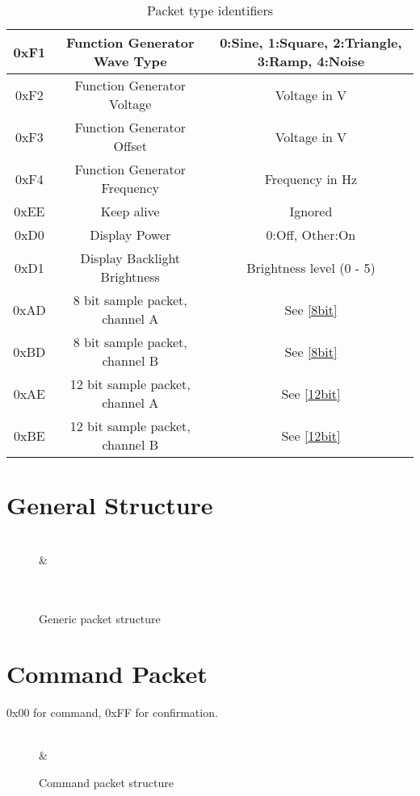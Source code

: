 \documentclass[]{article}
\begin{document}
\begin{table}[H]
\begin{tabular}{|c|c|c|}
		0xF1 & Function Generator Wave Type & 0:Sine, 1:Square, 2:Triangle, 3:Ramp, 4:Noise \\ \hline
		0xF2 & Function Generator Voltage & Voltage in \textmu V \\ \hline
		0xF3 & Function Generator Offset & Voltage in \textmu V \\ \hline
		0xF4 & Function Generator Frequency & Frequency in Hz \\ \hline
		0xEE & Keep alive & Ignored \\ \hline
		0xD0 & Display Power & 0:Off, Other:On \\ \hline
		0xD1 & Display Backlight Brightness & Brightness level (0 - 5) \\ \hline
		0xAD & 8 bit sample packet, channel A & See \autoref{8bit} \\ \hline
		0xBD & 8 bit sample packet, channel B & See \autoref{8bit} \\ \hline
		0xAE & 12 bit sample packet, channel A & See \autoref{12bit} \\ \hline
		0xBE & 12 bit sample packet, channel B & See \autoref{12bit} \\ \hline
	\end{tabular}
	\caption{Packet type identifiers}
\end{table}

\section{General Structure}
\begin{figure}[H]
	\centering
	\begin{bytefield}[bitwidth=2em]{16}
		 \\
		 &  \\
		 \\
		 \\
	\end{bytefield}
	\caption{Generic packet structure}
\end{figure}

\section{Command Packet}

0x00 for command, 0xFF for confirmation.

\begin{figure}[H]
	\centering
	\begin{bytefield}[bitwidth=2em]{16}
		 \\
		 &  \\
	\end{bytefield}
	\caption{Command packet structure}
\end{figure}
\end{document}
